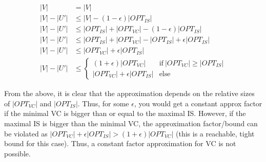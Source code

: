 \documentclass{article}
\begin{document}
\begin{align*}
    |V| &= |V| \\
    |V| - |U'| &\leq |V| - (1 - \epsilon)|OPT_{IS}| \\
    |V| - |U'| &\leq |OPT_{IS}| + |OPT_{VC}| - (1 - \epsilon)|OPT_{IS}| \\
    |V| - |U'| &\leq |OPT_{IS}| + |OPT_{VC}| - |OPT_{IS}| + \epsilon |OPT_{IS}| \\
    |V| - |U'| &\leq |OPT_{VC}| + \epsilon |OPT_{IS}| \\
    |V| - |U'| &\leq \begin{cases}
        (1 + \epsilon)|OPT_{VC}| & \text{if} \: |OPT_{VC}| \geq |OPT_{IS}| \\
        |OPT_{VC}| + \epsilon |OPT_{IS}| & \text{else}
    \end{cases}
\end{align*}

From the above, it is clear that the approximation depends on the relative sizes of $|OPT_{VC}|$ and $|OPT_{IS}|$. Thus,
for some $\epsilon$, you would get a constant approx factor if the minimal VC is bigger than or equal to the maximal IS.
However, if the maximal IS is bigger than the minimal VC, the approximation factor/bound can be violated as $|OPT_{VC}|
+ \epsilon |OPT_{IS}| > (1 + \epsilon)|OPT_{VC}|$ (this is a reachable, tight bound for this case).  Thus, a constant
factor approximation for VC is not possible.
\end{document}

